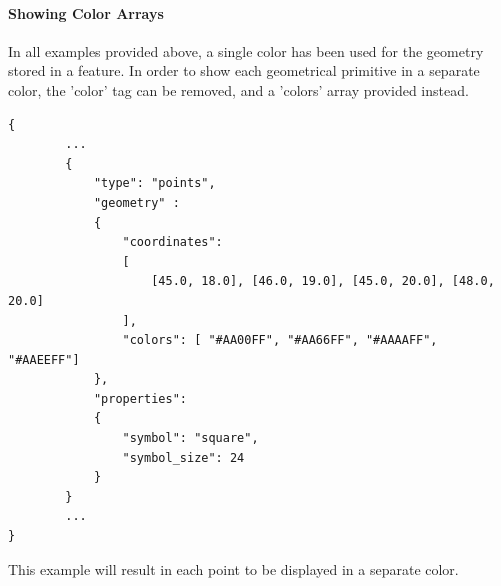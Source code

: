 


\paragraph{Showing Color Arrays} In all examples provided above, a single color has been used for the geometry stored in a feature.
In order to show each geometrical primitive in a separate color, the 'color' tag can be removed, and a 'colors' array provided instead.

\begin{lstlisting}[basicstyle=\small\ttfamily]
{
        ...
        {
            "type": "points",
            "geometry" :
            {
                "coordinates": 
                [
                    [45.0, 18.0], [46.0, 19.0], [45.0, 20.0], [48.0, 20.0]
                ],
                "colors": [ "#AA00FF", "#AA66FF", "#AAAAFF", "#AAEEFF"]
            },
            "properties":
            {
                "symbol": "square",
                "symbol_size": 24
            }
        }
        ...
}
\end{lstlisting}

This example will result in each point to be displayed in a separate color.

